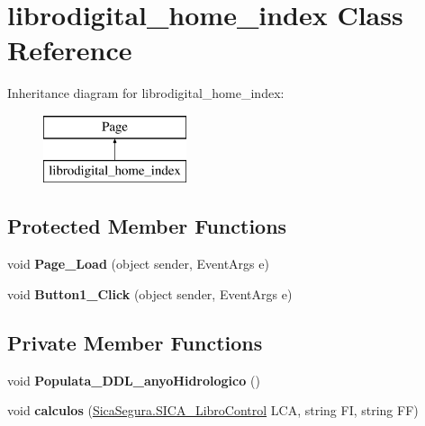 \hypertarget{classlibrodigital__home__index}{}\section{librodigital\+\_\+home\+\_\+index Class Reference}
\label{classlibrodigital__home__index}
Inheritance diagram for librodigital\+\_\+home\+\_\+index\+:\begin{figure}[H]
\begin{center}
\leavevmode
\includegraphics[height=2.000000cm]{classlibrodigital__home__index}
\end{center}
\end{figure}
\subsection*{Protected Member Functions}
\begin{DoxyCompactItemize}
\item 
void {\bfseries Page\+\_\+\+Load} (object sender, Event\+Args e)\hypertarget{classlibrodigital__home__index_a2c4adb97d3116d87066781035de7d89b}{}\label{classlibrodigital__home__index_a2c4adb97d3116d87066781035de7d89b}

\item 
void {\bfseries Button1\+\_\+\+Click} (object sender, Event\+Args e)\hypertarget{classlibrodigital__home__index_ad705566584823771f932837ca28020da}{}\label{classlibrodigital__home__index_ad705566584823771f932837ca28020da}

\end{DoxyCompactItemize}
\subsection*{Private Member Functions}
\begin{DoxyCompactItemize}
\item 
void {\bfseries Populata\+\_\+\+D\+D\+L\+\_\+anyo\+Hidrologico} ()\hypertarget{classlibrodigital__home__index_abeed0361b62df8479e6158ef902880f6}{}\label{classlibrodigital__home__index_abeed0361b62df8479e6158ef902880f6}

\item 
void {\bfseries calculos} (\hyperlink{class_sica_segura_1_1_s_i_c_a___libro_control}{Sica\+Segura.\+S\+I\+C\+A\+\_\+\+Libro\+Control} L\+CA, string FI, string FF)\hypertarget{classlibrodigital__home__index_a99d998461ab4ad42cb76ae280b4d1316}{}\label{classlibrodigital__home__index_a99d998461ab4ad42cb76ae280b4d1316}

\end{DoxyCompactItemize}
